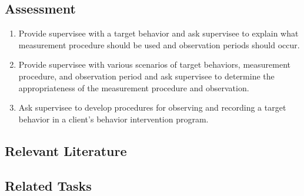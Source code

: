 \subsection{Assessment}
\begin{enumerate}
\item Provide supervisee with a target behavior and ask supervisee to explain what measurement procedure should be used and observation periods should occur.
\item Provide supervisee with various scenarios of target behaviors, measurement procedure, and observation period and ask supervisee to determine the appropriateness of the measurement procedure and observation.
\item Ask supervisee to develop procedures for observing and recording a target behavior in a client's behavior intervention program.
%
\end{enumerate}
%
\subsection{Relevant Literature}
\begin{refsection}
\nocite{test,alang2017police,clayton2018black}
\printbibliography[heading=none]
\end{refsection}
%
\subsection{Related Tasks}
\fouraOne{}\\
\fouraTwo{}\\
\fouraThree{}\\
\fouraFour{}\\
\fouraFive{}\\
\fouraSix{}\\
\fouraSeven{}\\
\fouraTwelve{}\\
\fouraThirteen{}\\
\fouraFourteen{}\\
\fourFKFourtySeven{}\\
\fourFKFourtyEight{}\\
%
%
%
%
%
%
\section[\fourhThree{}]{\fourhThree{}%
              }
